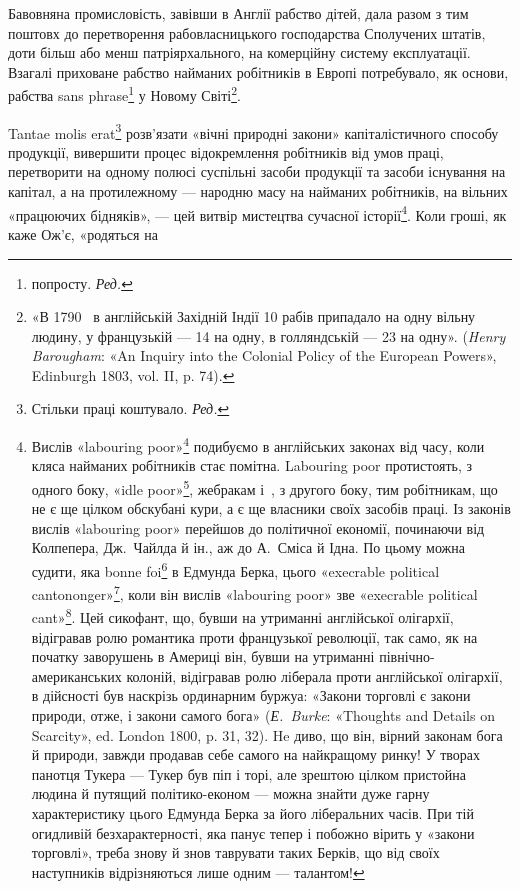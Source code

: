 Бавовняна промисловість, завівши в Англії рабство дітей,
дала разом з тим поштовх до перетворення рабовласницького
господарства Сполучених штатів, доти більш або менш патріярхального,
на комерційну систему експлуатації. Взагалі приховане
рабство найманих робітників в Европі потребувало, як основи,
рабства sans phrase\footnote*{
попросту. \emph{Ред.}
} у Новому Світі\footnote{
«В 1790~ в англійській Західній Індії 10 рабів припадало на
одну вільну людину, у французькій — 14 на одну, в голляндській — 23
на одну». (\emph{Henry Barougham}: «An Inquiry into the Colonial Policy of
the European Powers», Edinburgh 1803, vol. II, p. 74).
}.

Tantae molis erat\footnote*{
Стільки праці коштувало. \emph{Ред.}
} розв’язати «вічні природні закони»
капіталістичного способу продукції, вивершити процес відокремлення
робітників від умов праці, перетворити на одному
полюсі суспільні засоби продукції та засоби існування на капітал,
а на протилежному — народню масу на найманих робітників,
на вільних «працюючих бідняків», — цей витвір мистецтва
сучасної історії\footnote{
Вислів «labouring poor»\footnote*{
працюючі бідняки. \emph{Ред.}
} подибуємо в англійських законах від
часу, коли кляса найманих робітників стає помітна. Labouring poor протистоять,
з одного боку, «idle poor»\footnote*{
біднякам-неробам. \emph{Ред.}
}, жебракам і~, з другого боку,
тим робітникам, що не є ще цілком обскубані кури, а є ще власники
своїх засобів праці. Із законів вислів «labouring poor» перейшов
до політичної економії, починаючи від Колпепера, Дж.~Чайлда й ін.,
аж до А.~Сміса й Ідна. По цьому можна судити, яка bonne foi\footnote*{
сумлінність. \emph{Ред.}
} в Едмунда
Берка, цього «execrable political cantononger»\footnote*{
огидливого політичного крамаря. \emph{Ред.}
}, коли він вислів
«labouring poor» зве «execrable political cant»\footnote*{
огидливим політичним перекрученням. \emph{Ред.}
}. Цей сикофант, що,
бувши на утриманні англійської олігархії, відігравав ролю романтика проти
французької революції, так само, як на початку заворушень в Америці
він, бувши на утриманні північно-американських колоній, відігравав
ролю ліберала проти англійської олігархії, в дійсності був наскрізь ординарним
буржуа: «Закони торговлі є закони природи, отже, і закони самого
бога» (\emph{Е.~Burke}: «Thoughts and Details on Scarcity», ed. London
1800, p. 31, 32). He диво, що він, вірний законам бога й природи, завжди
продавав себе самого на найкращому ринку! У творах панотця Тукера —
Тукер був піп і торі, але зрештою цілком пристойна людина й путящий
політико-економ — можна знайти дуже гарну характеристику цього
Едмунда Берка за його ліберальних часів. При тій огидливій безхарактерності,
яка панує тепер і побожно вірить у «закони торговлі», треба
знову й знов таврувати таких Берків, що від своїх наступників відрізняються
лише одним — талантом!
}. Коли гроші, як каже Ож’є, «родяться на

